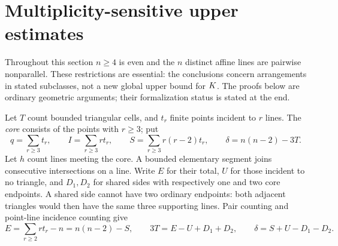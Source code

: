 \section{Multiplicity-sensitive upper estimates}
\label{jup:section}

Throughout this section $n\ge4$ is even and the $n$ distinct affine lines are pairwise nonparallel. These restrictions are essential: the conclusions concern arrangements in stated subclasses, not a new global upper bound for $K$. The proofs below are ordinary geometric arguments; their formalization status is stated at the end.

Let $T$ count bounded triangular cells, and $t_r$ finite points incident to $r$ lines. The \emph{core} consists of the points with $r\ge3$; put
\[
 q=\sum_{r\ge3}t_r,\qquad I=\sum_{r\ge3}rt_r,\qquad
 S=\sum_{r\ge3}r(r-2)t_r,\qquad \delta=n(n-2)-3T.
\]
Let $h$ count lines meeting the core. A bounded elementary segment joins consecutive intersections on a line. Write $E$ for their total, $U$ for those incident to no triangle, and $D_1,D_2$ for shared sides with respectively one and two core endpoints. A shared side cannot have two ordinary endpoints: both adjacent triangles would then have the same three supporting lines. Pair counting and point-line incidence counting give
\begin{equation}
 E=\sum_{r\ge2}rt_r-n=n(n-2)-S,\qquad
 3T=E-U+D_1+D_2,\qquad
 \delta=S+U-D_1-D_2.
 \label{jup:identity}
\end{equation}

